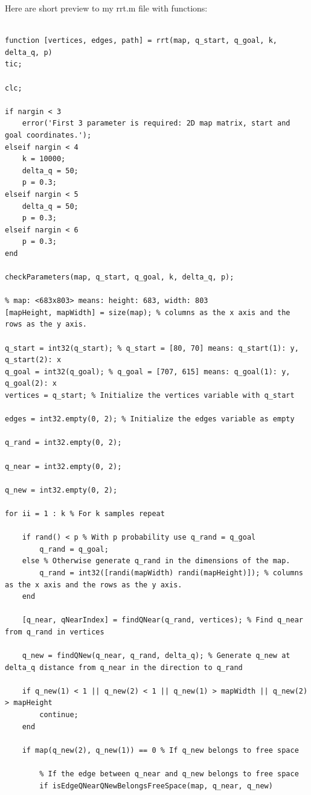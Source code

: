 \documentclass{article}
\begin{document}
		Here are short preview to my rrt.m file with functions:

	\begin{lstlisting}[label=rrt-m, caption=rrt.m]
	
function [vertices, edges, path] = rrt(map, q_start, q_goal, k, delta_q, p)
tic;

clc;

if nargin < 3
    error('First 3 parameter is required: 2D map matrix, start and goal coordinates.');
elseif nargin < 4
    k = 10000;
    delta_q = 50;
    p = 0.3;
elseif nargin < 5
    delta_q = 50;
    p = 0.3;
elseif nargin < 6
    p = 0.3;
end

checkParameters(map, q_start, q_goal, k, delta_q, p);

% map: <683x803> means: height: 683, width: 803
[mapHeight, mapWidth] = size(map); % columns as the x axis and the rows as the y axis.

q_start = int32(q_start); % q_start = [80, 70] means: q_start(1): y, q_start(2): x
q_goal = int32(q_goal); % q_goal = [707, 615] means: q_goal(1): y, q_goal(2): x 
vertices = q_start; % Initialize the vertices variable with q_start

edges = int32.empty(0, 2); % Initialize the edges variable as empty

q_rand = int32.empty(0, 2);

q_near = int32.empty(0, 2);

q_new = int32.empty(0, 2);

for ii = 1 : k % For k samples repeat
    
    if rand() < p % With p probability use q_rand = q_goal
        q_rand = q_goal;
    else % Otherwise generate q_rand in the dimensions of the map.
        q_rand = int32([randi(mapWidth) randi(mapHeight)]); % columns as the x axis and the rows as the y axis.
    end
    
    [q_near, qNearIndex] = findQNear(q_rand, vertices); % Find q_near from q_rand in vertices
    
    q_new = findQNew(q_near, q_rand, delta_q); % Generate q_new at delta_q distance from q_near in the direction to q_rand
    
    if q_new(1) < 1 || q_new(2) < 1 || q_new(1) > mapWidth || q_new(2) > mapHeight
        continue;
    end
    
    if map(q_new(2), q_new(1)) == 0 % If q_new belongs to free space
        
        % If the edge between q_near and q_new belongs to free space
        if isEdgeQNearQNewBelongsFreeSpace(map, q_near, q_new)
            

\end{lstlisting}
\end{document}
